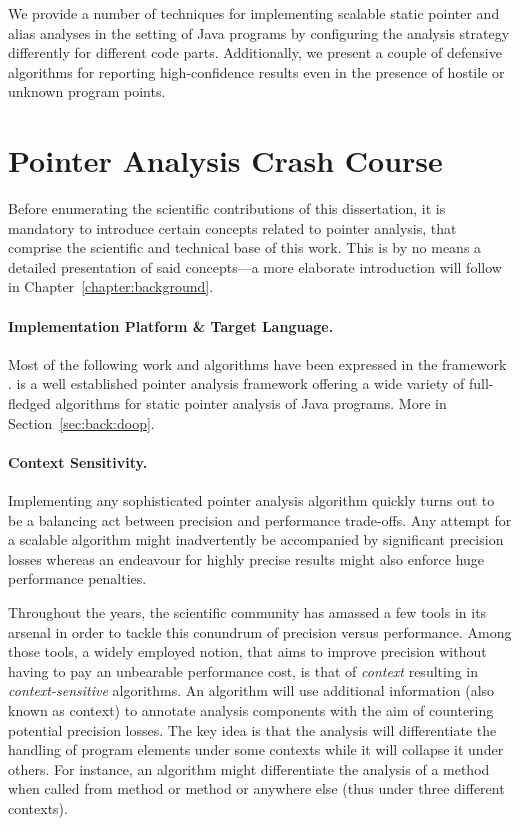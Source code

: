 We provide a number of techniques for implementing scalable static pointer and alias analyses in the setting of Java programs by configuring the analysis strategy differently for different code parts. Additionally, we present a couple of defensive algorithms for reporting high-confidence results even in the presence of hostile or unknown program points.


\section{Pointer Analysis Crash Course}

Before enumerating the scientific contributions of this dissertation, it is mandatory to introduce certain concepts related to pointer analysis, that comprise the scientific and technical base of this work. This is by no means a detailed presentation of said concepts---a more elaborate introduction will follow in Chapter~\ref{chapter:background}.

\paragraph*{Implementation Platform \& Target Language.}
Most of the following work and algorithms have been expressed in the \doop{} framework \cite{oopsla:2009:Bravenboer}. \doop{} is a well established pointer analysis framework offering a wide variety of full-fledged algorithms for static pointer analysis of Java programs. More in Section~\ref{sec:back:doop}.


\paragraph*{Context Sensitivity.}
Implementing any sophisticated pointer analysis algorithm quickly turns out to be a balancing act between precision and performance trade-offs. Any attempt for a scalable algorithm might inadvertently be accompanied by significant precision losses whereas an endeavour for highly precise results might also enforce huge performance penalties.

Throughout the years, the scientific community has amassed a few tools in its arsenal in order to tackle this conundrum of precision versus performance. Among those tools, a widely employed notion, that aims to improve precision without having to pay an unbearable performance cost, is that of \emph{context} resulting in \emph{context-sensitive} algorithms. An algorithm will use additional information (also known as context) to annotate analysis components with the aim of countering potential precision losses. The key idea is that the analysis will differentiate the handling of program elements under some contexts while it will collapse it under others. For instance, an algorithm might differentiate the analysis of a method when called from method  or method  or anywhere else (thus under three different contexts).

